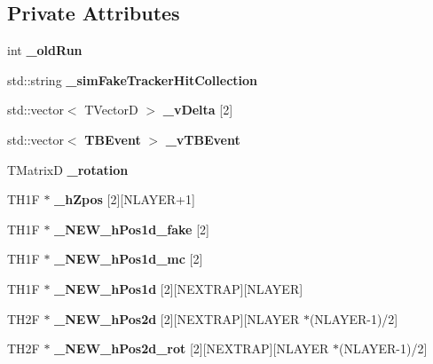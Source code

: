 \subsection*{Private Attributes}
\begin{DoxyCompactItemize}
\item 
int {\bfseries \-\_\-old\-Run}\label{classTBTrackScatter_a2372dac837987cb91190c765e88afe5e}

\item 
std\-::string {\bfseries \-\_\-sim\-Fake\-Tracker\-Hit\-Collection}\label{classTBTrackScatter_aa6588dd0c39bb7233713e0316aa79bf1}

\item 
std\-::vector$<$ T\-Vector\-D $>$ {\bfseries \-\_\-v\-Delta} [2]\label{classTBTrackScatter_a4cc08b20f1c47a776a17b0fbdf3b5cde}

\item 
std\-::vector$<$ {\bf T\-B\-Event} $>$ {\bfseries \-\_\-v\-T\-B\-Event}\label{classTBTrackScatter_a8b5488d90a4609d9ad0c76bd8b9eafc0}

\item 
T\-Matrix\-D {\bfseries \-\_\-rotation}\label{classTBTrackScatter_a6e0f3f493843e958a26f97abdf016719}

\item 
T\-H1\-F $\ast$ {\bfseries \-\_\-h\-Zpos} [2][N\-L\-A\-Y\-E\-R+1]\label{classTBTrackScatter_a6346d26d8e806ce65a0c2c4988f0c4c1}

\item 
T\-H1\-F $\ast$ {\bfseries \-\_\-\-N\-E\-W\-\_\-h\-Pos1d\-\_\-fake} [2]\label{classTBTrackScatter_a97015843273ab4a90ebeb8cdb69a4992}

\item 
T\-H1\-F $\ast$ {\bfseries \-\_\-\-N\-E\-W\-\_\-h\-Pos1d\-\_\-mc} [2]\label{classTBTrackScatter_a19bbb91bc1540399f5eaee549556f316}

\item 
T\-H1\-F $\ast$ {\bfseries \-\_\-\-N\-E\-W\-\_\-h\-Pos1d} [2][N\-E\-X\-T\-R\-A\-P][N\-L\-A\-Y\-E\-R]\label{classTBTrackScatter_a97b84e856a277819cd7f247ea60d44a6}

\item 
T\-H2\-F $\ast$ {\bfseries \-\_\-\-N\-E\-W\-\_\-h\-Pos2d} [2][N\-E\-X\-T\-R\-A\-P][N\-L\-A\-Y\-E\-R $\ast$(N\-L\-A\-Y\-E\-R-\/1)/2]\label{classTBTrackScatter_a6603bd7007c65e8d0c1629f2aea1f28e}

\item 
T\-H2\-F $\ast$ {\bfseries \-\_\-\-N\-E\-W\-\_\-h\-Pos2d\-\_\-rot} [2][N\-E\-X\-T\-R\-A\-P][N\-L\-A\-Y\-E\-R $\ast$(N\-L\-A\-Y\-E\-R-\/1)/2]\label{classTBTrackScatter_ad1e3af55a110dbf0643010d441081184}

\end{DoxyCompactItemize}

